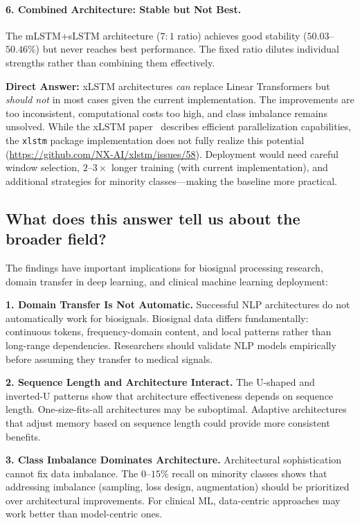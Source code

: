 \paragraph{6. Combined Architecture: Stable but Not Best.}
The \ac{mLSTM}+\ac{sLSTM} architecture ($7{:}1$ ratio) achieves good stability ($50.03$--$50.46\%$) but never reaches best performance. The fixed ratio dilutes individual strengths rather than combining them effectively.

\textbf{Direct Answer:} \ac{xLSTM} architectures \textit{can} replace Linear Transformers but \textit{should not} in most cases given the current implementation. The improvements are too inconsistent, computational costs too high, and class imbalance remains unsolved. While the \ac{xLSTM} paper~\cite{beck2024xlstm} describes efficient parallelization capabilities, the \texttt{xlstm} package implementation does not fully realize this potential (\url{https://github.com/NX-AI/xlstm/issues/58}). Deployment would need careful window selection, $2$--$3\times$ longer training (with current implementation), and additional strategies for minority classes---making the baseline more practical.

\subsection{What does this answer tell us about the broader field?}

The findings have important implications for biosignal processing research, domain transfer in deep learning, and clinical machine learning deployment:

\textbf{1. Domain Transfer Is Not Automatic.} Successful \ac{NLP} architectures do not automatically work for biosignals. Biosignal data differs fundamentally: continuous tokens, frequency-domain content, and local patterns rather than long-range dependencies. Researchers should validate \ac{NLP} models empirically before assuming they transfer to medical signals.

\textbf{2. Sequence Length and Architecture Interact.} The U-shaped and inverted-U patterns show that architecture effectiveness depends on sequence length. One-size-fits-all architectures may be suboptimal. Adaptive architectures that adjust memory based on sequence length could provide more consistent benefits.

\textbf{3. Class Imbalance Dominates Architecture.} Architectural sophistication cannot fix data imbalance. The $0$--$15\%$ recall on minority classes shows that addressing imbalance (sampling, loss design, augmentation) should be prioritized over architectural improvements. For clinical \ac{ML}, data-centric approaches may work better than model-centric ones.

